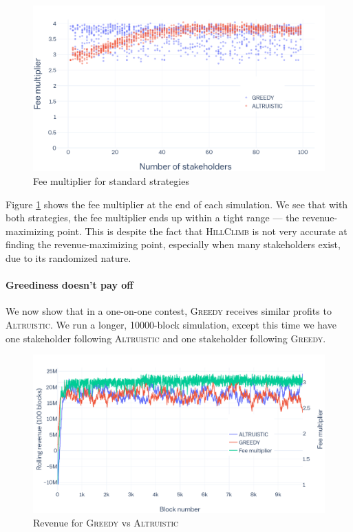 \documentclass[letterpaper,12pt,oneside]{article}
\begin{document}
\begin{figure}[!h]
    \centering
    \includegraphics[width=0.9\linewidth]{standard-convergence-fees.png}
    \caption{Fee multiplier for standard strategies}
    \label{standard-convergence-fees}
\end{figure}

Figure \ref{standard-convergence-fees} shows the fee multiplier at the end of each simulation. We see that with both strategies, the fee multiplier ends up within a tight range --- the revenue-maximizing point. This is despite the fact that \textsc{HillClimb} is not very accurate at finding the revenue-maximizing point, especially when many stakeholders exist, due to its randomized nature.

\paragraph*{Greediness doesn't pay off} We now show that in a one-on-one contest, \textsc{Greedy} receives similar profits to \textsc{Altruistic}. We run a longer, 10000-block simulation, except this time we have one stakeholder following \textsc{Altruistic} and one stakeholder following \textsc{Greedy}.

\begin{figure}[!h]
    \centering
    \includegraphics[width=0.9\linewidth]{no-greedy.png}
    \caption{Revenue for \textsc{Greedy} vs \textsc{Altruistic}}
    \label{no-greedy}
\end{figure}
\end{document}
